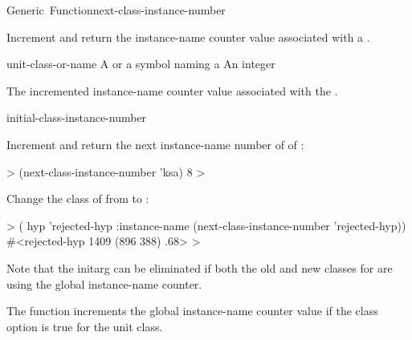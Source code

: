 \documentclass[10pt,twoside,english,pdftex]{article}
\begin{document}
\begin{functiondoc}{Generic~Function}{next-class-instance-number}%
  {
    }
%
%

\fnsyntax

\fnpurpose Increment and return the instance-name counter value
associated with a .

\fnmethods
{}%
  {\code{(} 
  \returns{} } 
%
  {\code{(} 
  \returns{} }

\fnpackage {}

\fnmodule {}

\fnargs
\begin{args}{unit-class-or-name}
 A  or a symbol naming a
\arg[integer] An integer
\end{args}

\fnreturns The incremented instance-name counter value
associated with the .

\begin{alsos}{initial-class-instance-number}
\end{alsos}

\fnexamples
%
Increment and return the next instance-name number of 
of :
%
\W\supp
\begin{example}
  > (next-class-instance-number 'ksa)
  8
  >
\end{example} 

%
%
Change the class of   from
 to :
%
\W\supp
\begin{example}
  > ( hyp 'rejected-hyp 
      :instance-name (next-class-instance-number 'rejected-hyp))
  #<rejected-hyp 1409 (896 388) .68>
  >
\end{example}
%
Note that the  initarg can be eliminated if both
the old and new classes for  are using the global instance-name
counter.

\fnnote
%
%
The  function increments the global
instance-name counter value if the
 class option is true for the
unit class.

\end{functiondoc}
\end{document}
